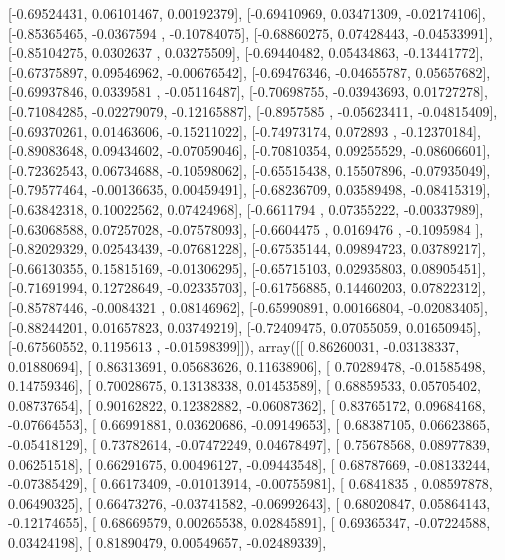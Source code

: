 \documentclass{article}
\begin{document}
       [-0.69524431,  0.06101467,  0.00192379],
       [-0.69410969,  0.03471309, -0.02174106],
       [-0.85365465, -0.0367594 , -0.10784075],
       [-0.68860275,  0.07428443, -0.04533991],
       [-0.85104275,  0.0302637 ,  0.03275509],
       [-0.69440482,  0.05434863, -0.13441772],
       [-0.67375897,  0.09546962, -0.00676542],
       [-0.69476346, -0.04655787,  0.05657682],
       [-0.69937846,  0.0339581 , -0.05116487],
       [-0.70698755, -0.03943693,  0.01727278],
       [-0.71084285, -0.02279079, -0.12165887],
       [-0.8957585 , -0.05623411, -0.04815409],
       [-0.69370261,  0.01463606, -0.15211022],
       [-0.74973174,  0.072893  , -0.12370184],
       [-0.89083648,  0.09434602, -0.07059046],
       [-0.70810354,  0.09255529, -0.08606601],
       [-0.72362543,  0.06734688, -0.10598062],
       [-0.65515438,  0.15507896, -0.07935049],
       [-0.79577464, -0.00136635,  0.00459491],
       [-0.68236709,  0.03589498, -0.08415319],
       [-0.63842318,  0.10022562,  0.07424968],
       [-0.6611794 ,  0.07355222, -0.00337989],
       [-0.63068588,  0.07257028, -0.07578093],
       [-0.6604475 ,  0.0169476 , -0.1095984 ],
       [-0.82029329,  0.02543439, -0.07681228],
       [-0.67535144,  0.09894723,  0.03789217],
       [-0.66130355,  0.15815169, -0.01306295],
       [-0.65715103,  0.02935803,  0.08905451],
       [-0.71691994,  0.12728649, -0.02335703],
       [-0.61756885,  0.14460203,  0.07822312],
       [-0.85787446, -0.0084321 ,  0.08146962],
       [-0.65990891,  0.00166804, -0.02083405],
       [-0.88244201,  0.01657823,  0.03749219],
       [-0.72409475,  0.07055059,  0.01650945],
       [-0.67560552,  0.1195613 , -0.01598399]]), array([[ 0.86260031, -0.03138337,  0.01880694],
       [ 0.86313691,  0.05683626,  0.11638906],
       [ 0.70289478, -0.01585498,  0.14759346],
       [ 0.70028675,  0.13138338,  0.01453589],
       [ 0.68859533,  0.05705402,  0.08737654],
       [ 0.90162822,  0.12382882, -0.06087362],
       [ 0.83765172,  0.09684168, -0.07664553],
       [ 0.66991881,  0.03620686, -0.09149653],
       [ 0.68387105,  0.06623865, -0.05418129],
       [ 0.73782614, -0.07472249,  0.04678497],
       [ 0.75678568,  0.08977839,  0.06251518],
       [ 0.66291675,  0.00496127, -0.09443548],
       [ 0.68787669, -0.08133244, -0.07385429],
       [ 0.66173409, -0.01013914, -0.00755981],
       [ 0.6841835 ,  0.08597878,  0.06490325],
       [ 0.66473276, -0.03741582, -0.06992643],
       [ 0.68020847,  0.05864143, -0.12174655],
       [ 0.68669579,  0.00265538,  0.02845891],
       [ 0.69365347, -0.07224588,  0.03424198],
       [ 0.81890479,  0.00549657, -0.02489339],
\end{document}
